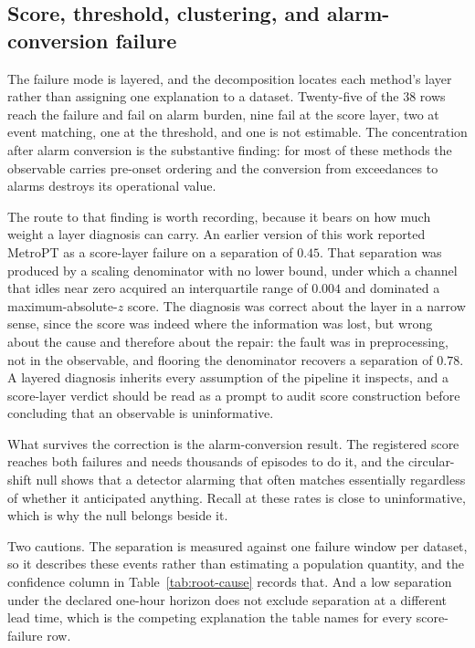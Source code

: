 \subsection{Score, threshold, clustering, and alarm-conversion failure}

The failure mode is layered, and the decomposition locates each method's layer rather than assigning one explanation to a dataset. Twenty-five of the 38 rows reach the failure and fail on alarm burden, nine fail at the score layer, two at event matching, one at the threshold, and one is not estimable. The concentration after alarm conversion is the substantive finding: for most of these methods the observable carries pre-onset ordering and the conversion from exceedances to alarms destroys its operational value.

The route to that finding is worth recording, because it bears on how much weight a layer diagnosis can carry. An earlier version of this work reported MetroPT as a score-layer failure on a separation of \(0.45\). That separation was produced by a scaling denominator with no lower bound, under which a channel that idles near zero acquired an interquartile range of \(0.004\) and dominated a maximum-absolute-\(z\) score. The diagnosis was correct about the layer in a narrow sense, since the score was indeed where the information was lost, but wrong about the cause and therefore about the repair: the fault was in preprocessing, not in the observable, and flooring the denominator recovers a separation of \(0.78\). A layered diagnosis inherits every assumption of the pipeline it inspects, and a score-layer verdict should be read as a prompt to audit score construction before concluding that an observable is uninformative.

What survives the correction is the alarm-conversion result. The registered score reaches both failures and needs thousands of episodes to do it, and the circular-shift null shows that a detector alarming that often matches essentially regardless of whether it anticipated anything. Recall at these rates is close to uninformative, which is why the null belongs beside it.

Two cautions. The separation is measured against one failure window per dataset, so it describes these events rather than estimating a population quantity, and the confidence column in Table~\ref{tab:root-cause} records that. And a low separation under the declared one-hour horizon does not exclude separation at a different lead time, which is the competing explanation the table names for every score-failure row.

